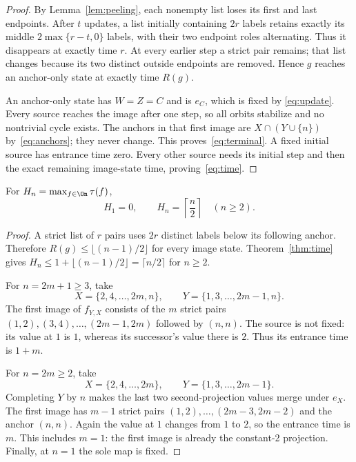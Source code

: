 \begin{proof}
By Lemma~\ref{lem:peeling}, each nonempty list loses its first and last
endpoints. After $t$ updates, a list initially containing $2r$ labels
retains exactly its middle $2\max\{r-t,0\}$ labels, with their two
endpoint roles alternating. Thus it disappears at exactly time $r$.
At every earlier step a strict pair remains; that list changes because
its two distinct outside endpoints are removed. Hence $g$ reaches an
anchor-only state at exactly time $R(g)$.

An anchor-only state has $W=Z=C$ and is $e_C$, which is fixed by
\eqref{eq:update}. Every source reaches the image after one step, so
all orbits stabilize and no nontrivial cycle exists. The anchors in that
first image are $X\cap(Y\cup\{n\})$ by~\eqref{eq:anchors}; they
never change. This proves~\eqref{eq:terminal}. A fixed initial source
has entrance time zero. Every other source needs its initial step and
then the exact remaining image-state time, proving~\eqref{eq:time}.
\end{proof}

\begin{theorem}\label{thm:sharp}
For $H_n=\max_{f\in\On}\tau(f)$,
\[
 H_1=0,\qquad H_n=\left\lceil\frac n2\right\rceil\quad(n\ge2).
\]
\end{theorem}

\begin{proof}
A strict list of $r$ pairs uses $2r$ distinct labels below its following
anchor. Therefore $R(g)\le\lfloor(n-1)/2\rfloor$ for every image
state. Theorem~\ref{thm:time} gives
$H_n\le1+\lfloor(n-1)/2\rfloor=\lceil n/2\rceil$ for $n\ge2$.

For $n=2m+1\ge3$, take
\[
 X=\{2,4,\ldots,2m,n\},\qquad
 Y=\{1,3,\ldots,2m-1,n\}.
\]
The first image of $f_{Y,X}$ consists of the $m$ strict pairs
$(1,2),(3,4),\ldots,(2m-1,2m)$ followed by $(n,n)$.
The source is not fixed: its value at $1$ is $1$, whereas its successor's
value there is $2$. Thus its entrance time is $1+m$.

For $n=2m\ge2$, take
\[
 X=\{2,4,\ldots,2m\},\qquad Y=\{1,3,\ldots,2m-1\}.
\]
Completing $Y$ by $n$ makes the last two second-projection values merge
under $e_X$. The first image has $m-1$ strict pairs
$(1,2),\ldots,(2m-3,2m-2)$ and the anchor $(n,n)$.
Again the value at $1$ changes from $1$ to $2$, so the entrance time is
$m$. This includes $m=1$: the first image is already the constant-2
projection. Finally, at $n=1$ the sole map is fixed.
\end{proof}
